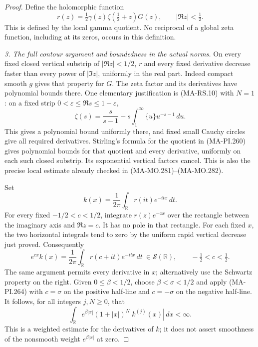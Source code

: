 \begin{proof}
Define the holomorphic function
\[
 r(z)=\tfrac12\gamma(z)\zeta(\tfrac12+z)G(z),
                       \qquad |\Re z|<\tfrac12.
 \tag{MA-PI.261}
\]
This is defined by the local gamma quotient.  No reciprocal
of a global zeta function, including at its zeros, occurs
in this definition.

\emph{3. The full contour argument and boundedness in the actual norms.}
On every fixed closed vertical substrip of \(|\Re z|<1/2\),
\(r\) and every fixed derivative decrease faster than every
power of \(|\Im z|\), uniformly in the real part.
Indeed compact smooth \(g\) gives that property for \(G\).
The zeta factor and its derivatives have polynomial bounds
there.  One elementary justification is (MA-RS.10) with
\(N=1\): on a fixed strip \(0<\varepsilon\le\Re s
\le1-\varepsilon\),
\[
 \zeta(s)=\frac{s}{s-1}
                  -s\int_1^\infty\{u\}u^{-s-1}\,du.
 \tag{MA-PI.262}
\]
This gives a polynomial bound uniformly there, and fixed
small Cauchy circles give all required derivatives.
Stirling's formula for the quotient in (MA-PI.260) gives
polynomial bounds for that quotient and every derivative,
uniformly on each such closed substrip.  Its exponential
vertical factors cancel.  This is also the precise local
estimate already checked in (MA-MO.281)--(MA-MO.282).

Set
\[
 k(x)=\frac1{2\pi}\int_{\mathbb R}r(it)e^{-itx}\,dt.
 \tag{MA-PI.263}
\]
For every fixed \(-1/2<c<1/2\), integrate
\(r(z)e^{-zx}\) over the rectangle between the imaginary
axis and \(\Re z=c\).  It has no pole in that rectangle.
For each fixed \(x\), the two horizontal integrals tend
to zero by the uniform rapid vertical decrease just proved.
Consequently
\[
 e^{cx}k(x)=\frac1{2\pi}
              \int_{\mathbb R}r(c+it)e^{-itx}\,dt
                  \ \in\mathcal S(\mathbb R),
               \qquad -\tfrac12<c<\tfrac12.
 \tag{MA-PI.264}
\]
The same argument permits every derivative in \(x\);
alternatively use the Schwartz property on the right.
Given \(0\le\beta<1/2\), choose
\(\beta<\sigma<1/2\) and apply (MA-PI.264) with
\(c=\sigma\) on the positive half-line and \(c=-\sigma\)
on the negative half-line.  It follows, for all integers
\(j,N\ge0\), that
\[
 \int_{\mathbb R} e^{\beta|x|}(1+|x|)^N
                          |k^{(j)}(x)|\,dx<\infty.
 \tag{MA-PI.265}
\]
This is a weighted estimate for the derivatives of \(k\);
it does not assert smoothness of the nonsmooth weight
\(e^{\beta|x|}\) at zero.


\end{proof}
